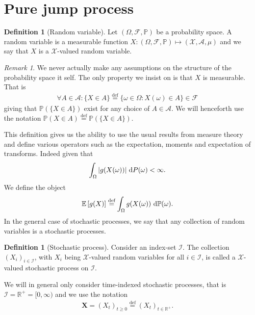 \documentclass[12pt,letter,twoside]{article}
\theoremstyle{plain}
\theoremstyle{definition}
\newtheorem{definition}[theorem]{Definition}
\theoremstyle{remark}
\newtheorem*{remark}{Remark}
\begin{document}
\section{Pure jump process}

\begin{definition}[Random variable]
Let $(\Omega, \mathcal F, \mathbb P)$ be a probability space. A random variable is a measurable function $X : (\Omega, \mathcal F, \mathbb P) \mapsto (\mathcal X,\mathcal A, \mu)$ and we say that $X$ is a $\mathcal X$-valued random variable.
\end{definition}
\begin{remark}
We never actually make any assumptions on the structure of the probability space it self. The only property we insist on is that $X$ is measurable. That is
\begin{align}
    \forall A \in \mathcal A : \{X \in A\}\stackrel{\text{def}}{=}\{\omega \in \Omega : X(\omega) \in A\}\in \mathcal F
\end{align}
giving that $\mathbb P(\{X\in A\})$ exist for any choice of $A\in \mathcal A$. We will henceforth use the notation $\mathbb P(X\in A)\stackrel{\text{def}}{=}\mathbb P(\{X\in A\})$.
\end{remark}
This definition gives us the ability to use the usual results from measure theory and define various operators such as the expectation, moments and expectation of transforms. Indeed given that
\begin{align}
\int_\Omega \vert g(X(\omega))\vert \ \text dP(\omega)<\infty.
\end{align}
We define the object
\begin{align}
\mathbb E\left[g(X)\right] \stackrel{\text{def}}{=}\int_\Omega g(X(\omega)) \ \text d\mathbb P(\omega).
\end{align}
In the general case of stochastic processes, we say that any collection of random variables is a stochastic processes.
\begin{definition}[Stochastic process]
Consider an index-set $\mathcal I$. The collection $(X_i)_{i\in \mathcal I}$, with $X_i$ being $\mathcal X$-valued random variables for all $i\in\mathcal I$, is called a $\mathcal X$-valued stochastic process on $\mathcal I$.
\end{definition}
We will in general only consider time-indexed stochastic processes, that is $\mathcal I=\mathbb R^+=[0,\infty)$ and we use the notation
\begin{align}
\mathbf X=(X_t)_{t\ge0}\stackrel{\text{def}}{=}(X_t)_{t\in\mathbb R^+}.
\end{align}
\end{document}
